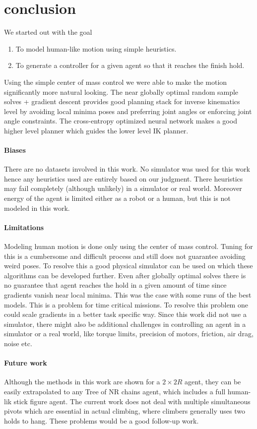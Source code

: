 \documentclass[12pt]{article}
\begin{document}
\section{conclusion}
We started out with the goal
\begin{enumerate}[nolistsep]
    \item To model human-like motion using simple heuristics.
    \item To generate a controller for a given agent so that it reaches the finish hold.
\end{enumerate}
Using the simple center of mass control we were able to make the motion significantly more natural looking.
The near globally optimal random sample solves + gradient descent provides good planning stack for inverse kinematics level by avoiding local minima poses and preferring joint angles or enforcing joint angle constraints. The cross-entropy optimized neural network makes a good higher level planner which guides the lower level IK planner.

\paragraph{Biases}
There are no datasets involved in this work.
No simulator was used for this work hence any heuristics used are entirely based on our judgment.
There heuristics may fail completely (although unlikely) in a simulator or real world.
Moreover energy of the agent is limited either as a robot or a human, but this is not modeled in this work.

\paragraph{Limitations}
Modeling human motion is done only using the center of mass control.
Tuning for this is a cumbersome and difficult process and still does not guarantee avoiding weird poses.
To resolve this a good physical simulator can be used on which these algorithms can be developed further.
Even after globally optimal solves there is no guarantee that agent reaches the hold in a given amount of time since gradients vanish near local minima.
This was the case with some runs of the best models.
This is a problem for time critical missions.
To resolve this problem one could scale gradients in a better task specific way.
Since this work did not use a simulator, there might also be additional challenges in controlling an agent in a simulator or a real world, like torque limits, precision of motors, friction, air drag, noise etc.

\paragraph{Future work}
Although the methods in this work are shown for a $2 \times 2R$ agent, they can be easily extrapolated to any Tree of NR chains agent, which includes a full human-lik stick figure agent.
The current work does not deal with multiple simultaneous pivots which are essential in actual climbing, where climbers generally uses two holds to hang.
These problems would be a good follow-up work.



\end{document}
